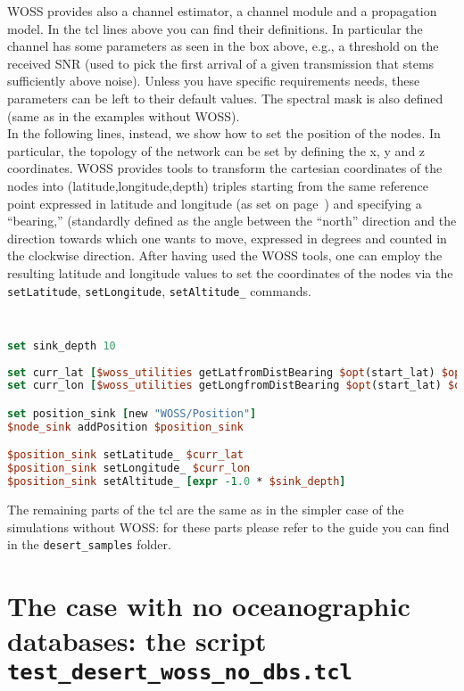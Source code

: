 \documentclass[11pt]{article}
\begin{document}
WOSS provides also a channel estimator, a channel module and a propagation model. In the tcl lines above you can find their definitions. In particular the channel has some parameters as seen in the box above, e.g., a threshold on the received SNR (used to pick the first arrival of a given transmission that stems sufficiently above noise). Unless you have specific requirements needs, these parameters can be left to their default values. The spectral mask is also defined (same as in the examples without WOSS).\\

In the following lines, instead, we show how to set the position of the nodes. In particular, the topology of the network can be set by defining the x, y and z coordinates. WOSS provides tools to transform the cartesian coordinates of the nodes into (latitude,longitude,depth) triples starting from the same reference point expressed in latitude and longitude (as set on page~\pageref{latlon_set}) and specifying a ``bearing,'' (standardly defined as the angle between the ``north'' direction and the direction towards which one wants to move, expressed in degrees and counted in the clockwise direction. After having used the WOSS tools, one can employ the resulting latitude and longitude values to set the coordinates of the nodes via the {\tt setLatitude}, {\tt setLongitude}, {\tt setAltitude\_} commands. 

\clearpage

{\scriptsize\tt
\begin{lstlisting}[language=tcl,showstringspaces=false]
set sink_depth 10
     
set curr_lat [$woss_utilities getLatfromDistBearing $opt(start_lat) $opt(start_long) 180.0 100]
set curr_lon [$woss_utilities getLongfromDistBearing $opt(start_lat) $opt(start_long) 90.0  100]

set position_sink [new "WOSS/Position"]
$node_sink addPosition $position_sink

$position_sink setLatitude_ $curr_lat
$position_sink setLongitude_ $curr_lon
$position_sink setAltitude_ [expr -1.0 * $sink_depth]
\end{lstlisting}
}

The remaining parts of the tcl are the same as in the simpler case of the simulations without WOSS: for these parts please refer to the guide you can find in the {\tt desert\_samples} folder.


\clearpage

\section{The case with no oceanographic databases: the script\\ {\tt test\_desert\_woss\_no\_dbs.tcl}}
\end{document}
